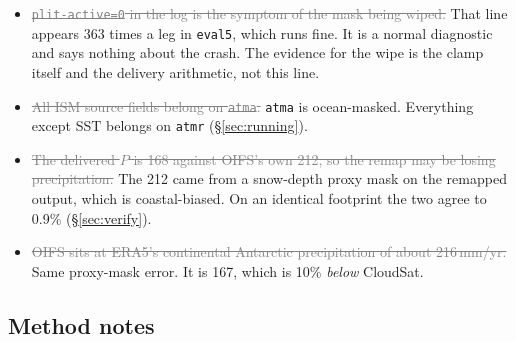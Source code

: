 \documentclass[11pt,a4paper]{article}
\newcommand{\code}[1]{\texttt{\small #1}}
\newcommand{\dead}[1]{\textcolor{gray}{\sout{#1}}}
\begin{document}
\begin{itemize}
      defects and neither causes this. A bounds-checked build cleared them by not trapping.
\item \dead{\code{plit-active=0} in the log is the symptom of the mask being wiped.} That line
      appears 363 times a leg in \code{eval5}, which runs fine. It is a normal diagnostic and says
      nothing about the crash. The evidence for the wipe is the clamp itself and the delivery
      arithmetic, not this line.
\item \dead{All ISM source fields belong on \code{atma}.} \code{atma} is ocean-masked. Everything
      except SST belongs on \code{atmr} (\S\ref{sec:running}).
\item \dead{The delivered $P$ is 168 against OIFS's own 212, so the remap may be losing
      precipitation.} The 212 came from a snow-depth proxy mask on the remapped output, which is
      coastal-biased. On an identical footprint the two agree to 0.9\% (\S\ref{sec:verify}).
\item \dead{OIFS sits at ERA5's continental Antarctic precipitation of about 216\,mm/yr.} Same
      proxy-mask error. It is 167, which is 10\% \emph{below} CloudSat.
\end{itemize}

\subsection{Method notes}
\end{document}
